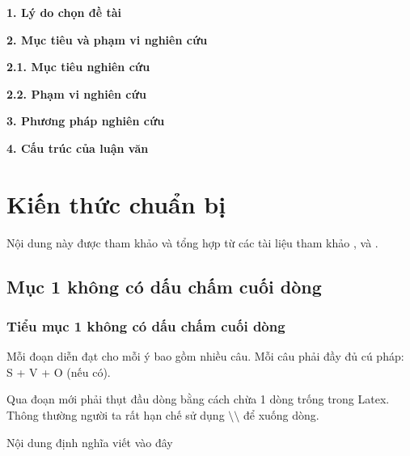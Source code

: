 \documentclass[a4paper,oneside]{../../styles/thesis}
\begin{document}
\newpage
{}
\listoftables %


\vskip2cm






\newpage


\lmd
\textbf{1. Lý do chọn đề tài}



\textbf{2. Mục tiêu và phạm vi nghiên cứu}

\textbf{2.1. Mục tiêu nghiên cứu}

\textbf{2.2. Phạm vi nghiên cứu}

\textbf{3. Phương pháp nghiên cứu}



\textbf{4. Cấu trúc của luận văn}



\hspace{.5cm} 
\chapter{Kiến thức chuẩn bị}
\setcounter{page}{1}
Nội dung này được tham khảo và tổng hợp từ các tài liệu tham khảo \cite{1}, \cite{2} và \cite{5}. 


\section{Mục 1 không có dấu chấm cuối dòng}
\subsection{Tiểu mục 1 không có dấu chấm cuối dòng}

Mỗi đoạn diễn đạt cho mỗi ý bao gồm nhiều câu. Mỗi câu phải đầy đủ cú pháp: S + V + O (nếu có).

Qua đoạn mới phải thụt đầu dòng bằng cách chừa 1 dòng trống trong Latex. Thông thường người ta rất hạn chế sử dụng $\setminus\setminus$ để xuống dòng. 
\begin{dn}
 Nội dung định nghĩa viết vào đây
\end{dn}
\end{document}
